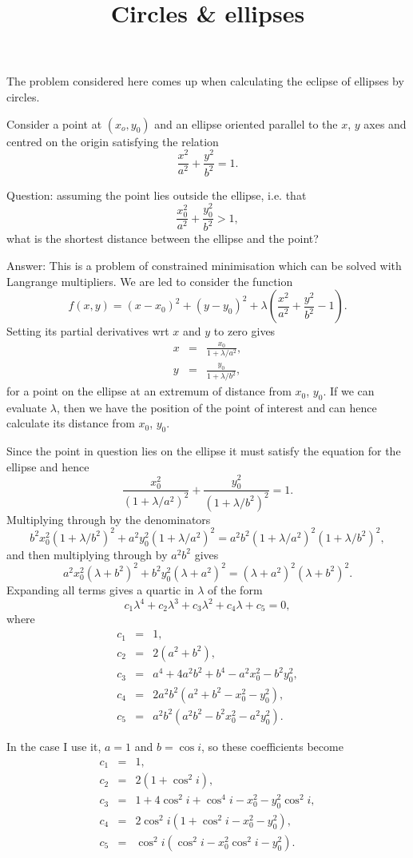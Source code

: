 \documentclass[a4paper,14pt,oneside]{extbook}
\title{Circles \& ellipses}
\begin{document}
The problem considered here comes up when calculating the eclipse of ellipses
by circles.

Consider a point at $(x_o,y_0)$ and an ellipse oriented parallel to the $x$,
$y$ axes and centred on the origin satisfying the relation
\[ \frac{x^2}{a^2} + \frac{y^2}{b^2} = 1.\]

Question: assuming the point lies outside the ellipse, i.e. that
\[ \frac{x_0^2}{a^2} + \frac{y_0^2}{b^2} > 1,\]
what is the shortest distance between the ellipse and the point?

Answer: This is a problem of constrained minimisation which can be solved 
with Langrange multipliers. We are led to consider the function
\[ f(x,y) = (x-x_0)^2 + (y-y_0)^2 + \lambda \left(\frac{x^2}{a^2} + 
\frac{y^2}{b^2}  -1\right).\]
Setting its partial derivatives wrt $x$ and $y$ to zero gives
\begin{eqnarray*}
x &=& \frac{x_0}{1+\lambda/a^2},\\
y &=& \frac{y_0}{1+\lambda/b^2},
\end{eqnarray*}
for a point on the ellipse at an extremum of distance from $x_0$, $y_0$. If we
can evaluate $\lambda$, then we have the position of the point of interest and
can hence calculate its distance from $x_0$, $y_0$.

Since the point in question lies on the ellipse it must satisfy the equation
for the ellipse and hence
\[ \frac{x_0^2}{(1+\lambda/a^2)^2} + \frac{y_0^2}{(1+\lambda/b^2)^2} = 1.\]
Multiplying through by the denominators
\[ b^2 x_0^2 (1+\lambda/b^2)^2 + a^2 y_0^2 (1+\lambda/a^2)^2 = a^2 b^2 (1+\lambda/a^2)^2
(1+\lambda/b^2)^2,\]
and then multiplying through by $a^2 b^2$ gives
\[ a^2 x_0^2 (\lambda + b^2)^2 + b^2 y_0^2 (\lambda + a^2)^2 = (\lambda + a^2)^2
(\lambda + b^2)^2.\]
Expanding all terms gives a quartic in $\lambda$ of the form
\[ c_1 \lambda^4 + c_2 \lambda^3 + c_3 \lambda^2 + c_4 \lambda + c_ 5 = 0,\]
where
\begin{eqnarray*}
c_1 &=& 1,\\
c_2 &=& 2(a^2+b^2),\\
c_3 &=& a^4+4a^2b^2+b^4 - a^2 x_0^2 - b^2 y_0^2,\\
c_4 &=& 2a^2b^2 (a^2 + b^2 - x_0^2 - y_0^2),\\
c_5 &=& a^2b^2 (a^2b^2-b^2x_0^2 - a^2 y_0^2).
\end{eqnarray*}

In the case I use it, $a = 1$ and $b = \cos i$, so these coefficients become
\begin{eqnarray*}
c_1 &=& 1,\\
c_2 &=& 2(1+\cos^2 i),\\
c_3 &=& 1+4\cos^2 i+\cos^4 i - x_0^2 - y_0^2\cos^2 i,\\
c_4 &=& 2\cos^2 i (1 + \cos^2 i - x_0^2 - y_0^2),\\
c_5 &=& \cos^2 i (\cos^2 i - x_0^2\cos^2 i - y_0^2).
\end{eqnarray*}
\end{document}

